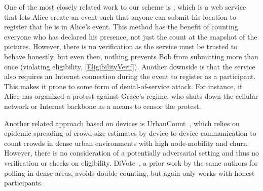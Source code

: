 One of the most closely related work to our scheme is \citet{CrowdCount}, which is a web service that lets Alice create an event such that anyone can submit his location to register that he is in Alice's event.
This method has the benefit of counting everyone who has declared his presence, not just the count at the snapshot of the pictures.
However, there is no verification as the service must be trusted to behave honestly, but even then, nothing prevents Bob from submitting more than once (violating eligibility, \cref{EligibilityVerif}).
Another downside is that the service also requires an Internet connection during the event to register as a participant.
This makes it prone to some form of denial-of-service attack.
For instance, if Alice has organized a protest against Grace's regime, who shuts down the cellular network or Internet backbone as a means to censor the protest.

Another related approach based on devices is UrbanCount~\cite{UrbanCount}, which relies on epidemic spreading of crowd-size estimates by device-to-device communication to count crowds in dense urban environments with high node-mobility and churn.
However, there is no consideration of a potentially adversarial setting and thus no verification or checks on eligibility.  DiVote~\cite{DiVote}, a prior work by the same authors for polling in dense areas, avoids double counting, but again only works with honest participants.


